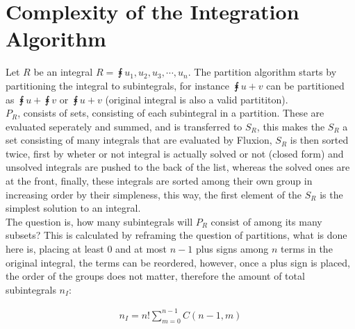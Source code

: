 \documentclass[11pt,a4paper]{book}
\begin{document}
\section{Complexity of the Integration Algorithm}

Let $R$ be an integral $R = \intx{u_1, u_2, u_3, \cdots, u_n}$. The partition algorithm starts by partitioning the integral to subintegrals, for instance $\intx{u + v}$ can be partitioned as $\intx{u} + \intx{v}$ or $\intx{u + v}$ (original integral is also a valid partititon).\\

$P_R$, consists of sets, consisting of each subintegral in a partition. These are evaluated seperately and summed, and is transferred to $S_R$, this makes the $S_R$ a set consisting of many integrals that are evaluated by Fluxion, $S_R$ is then sorted twice, first by wheter or not integral is actually solved or not (closed form) and unsolved integrals are pushed to the back of the list, whereas the solved ones are at the front, finally, these integrals are sorted among their own group in increasing order by their simpleness, this way, the first element of the $S_R$ is the simplest solution to an integral.\\

The question is, how many subintegrals will $P_R$ consist of among its many subsets? This is calculated by reframing the question of partitions, what is done here is, placing at least 0 and at most $n-1$ plus signs among $n$ terms in the original integral, the terms can be reordered, however, once a plus sign is placed, the order of the groups does not matter, therefore the amount of total subintegrals $n_I$:

\begin{align}
n_I = n! \sum_{m = 0}^{n - 1} C(n - 1, m)
\end{align}


\end{document}
